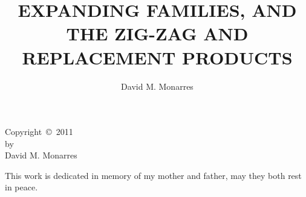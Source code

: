 \documentclass{sdsu-thesis}
\author{David M. Monarres}
\title{EXPANDING FAMILIES, AND THE ZIG-ZAG AND REPLACEMENT PRODUCTS}
\theoremstyle{definition}
\theoremstyle{remark}
\begin{document}
\maketitle

\makesignature

\begin{copyrightpage}
Copyright\  \copyright\  2011 \\
by \\
David M. Monarres
\end{copyrightpage}

\begin{dedication}
\vspace{3in}
\centering
This work is dedicated in memory of my mother and father, may they both rest in peace. 
\end{dedication}


% 


\begin{abstract}

\end{abstract}

\tableofcontents
\end{document}
